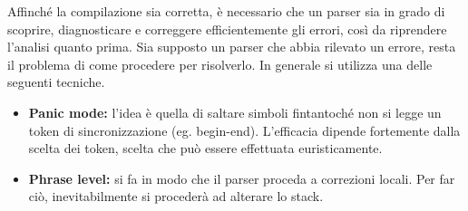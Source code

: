 \documentclass{subfiles}
\begin{document}
Affinché la compilazione sia corretta, è necessario che un parser sia in grado di scoprire, diagnosticare e correggere efficientemente gli errori,
così da riprendere l'analisi quanto prima.
Sia supposto un parser che abbia rilevato un errore, resta il problema di come procedere per risolverlo.
In generale si utilizza una delle seguenti tecniche.
\begin{itemize}
    \item \textbf{Panic mode:} l'idea è quella di saltare simboli fintantoché non si legge un token di sincronizzazione (eg. begin-end).
          L'efficacia dipende fortemente dalla scelta dei token, scelta che può essere effettuata euristicamente.

    \item \textbf{Phrase level:} si fa in modo che il parser proceda a correzioni locali.
          Per far ciò, inevitabilmente si procederà ad alterare lo stack.
\end{itemize}
\end{document}
